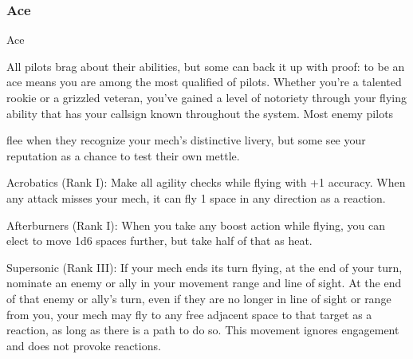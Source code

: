\subsubsection{Ace}

                                                       Ace

All pilots brag about their abilities, but some can back it up with proof: to be an ace means you are among
the most qualified of pilots. Whether you’re a talented rookie or a grizzled veteran, you’ve gained a level of
notoriety through your flying ability that has your callsign known throughout the system. Most enemy pilots

flee when they recognize your mech’s distinctive livery, but some see your reputation as a chance to test
their own mettle.

Acrobatics  (Rank I): Make all agility checks while flying with +1 accuracy. When any attack
misses your mech, it can fly 1 space in any direction as a reaction.

Afterburners  (Rank I): When you take any boost action while flying, you can elect to move 1d6
spaces further, but take half of that as heat.

Supersonic (Rank III): If your mech ends its turn flying, at the end of your turn, nominate an
enemy or ally in your movement range and line of sight. At the end of that enemy or ally’s turn,
even if they are no longer in line of sight or range from you, your mech may fly to any free
adjacent space to that target as a reaction, as long as there is a path to do so. This movement
ignores engagement and does not provoke reactions.